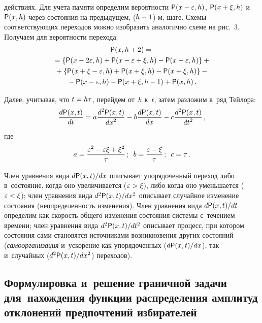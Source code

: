 \begin{multicols}{2}
\vspace*{9pt}

\setcounter{figure}{3}


\noindent
 действиях. Для учета памяти 
определим вероятности ${\sf P}(x-\varepsilon, h)$, ${\sf P}(x+\xi, h)$ и~${\sf P}(x, h)$ через 
состояния на предыдущем, ($h\hm-1$)-м, шаге. Схемы соответствующих 
переходов можно изобразить аналогично схеме на рис.~3. Получаем для 
вероятности пе\-ре\-хода:
    \begin{multline*}
    {\sf P}(x, h+2) ={}\\
    {}=\left\{ {\sf P}(x-2\varepsilon,h)+{\sf P}(x-\varepsilon+\xi,h) -{\sf P}(x-
\varepsilon,h)\right\} +{}\\
{}+\left\{ {\sf P}(x+\xi-\varepsilon,h)+
    {\sf P}(x+\xi,h)-{\sf P}(x+\xi, h)\right\} -{}\\
    {}-{\sf P}(x-\varepsilon, h)-{\sf P}(x+\xi, h-1)+ {\sf P}(x,h)\,.
    \end{multline*}
    
    Далее, учитывая, что $t\hm=h\tau$, перейдем от~$h$ к~$t$, затем разложим в~ряд Тейлора:
    \begin{equation}
    \displaystyle\frac{\displaystyle d{\sf P}(x,t)\mathstrut}{\displaystyle dt\mathstrut} =a\displaystyle\frac{\displaystyle d^2{\sf P}(x,t)\mathstrut}{\displaystyle dx^2\mathstrut} -b\displaystyle\frac{\displaystyle d{\sf P}(x,t)\mathstrut}{\displaystyle dx\mathstrut}-
c\displaystyle\frac{\displaystyle d^2{\sf P}(x,t)\mathstrut}{\displaystyle dt^2\mathstrut}\,,
    \label{e3-sig}
    \end{equation}
где 
$$
a=\displaystyle\frac{\displaystyle \varepsilon^2-\varepsilon\xi+\xi^2\mathstrut}{\displaystyle \tau\mathstrut}\,;\enskip
b=\displaystyle\frac{\displaystyle \varepsilon-\xi\mathstrut}{\displaystyle \tau\mathstrut}\,;\enskip c=\tau\,.
$$
    
    Член уравнения вида $d{\sf P}(x,t)/dx$ описывает упорядоченный переход либо 
в~состояние, когда оно увеличивается ($\varepsilon\hm>\xi$), либо когда оно 
уменьшается ($\varepsilon\hm<\xi$); член уравнения вида $d^2{\sf P}(x,t)/dx^2$ 
описывает случайное изменение со\-сто\-яния (неопределенность изменения). 
Член уравнения вида $d{\sf P}(x,t)/dt$ определим как ско\-рость общего изменения 
со\-сто\-яния сис\-те\-мы с~течением времени; член уравнения вида $d^2{\sf P}(x,t)/dt^2$ 
описывает процесс, при котором состояния сами становятся источниками 
возникновения других со\-сто\-яний (\textit{самоорганизация} и~ускорение как 
упорядоченных ($d{\sf P}(x,t)/dx$), так и~случайных ($d^2{\sf P}(x,t)/dx^2$) переходов). 

\subsection{Формулировка и~решение граничной задачи для~нахождения 
функции распределения амплитуд отклонений предпочтений избирателей}
 

\end{multicols}

